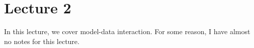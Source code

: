 \chapter{Lecture 2}
In this lecture, we cover model-data interaction. For some reason, I have almost no notes for this lecture.